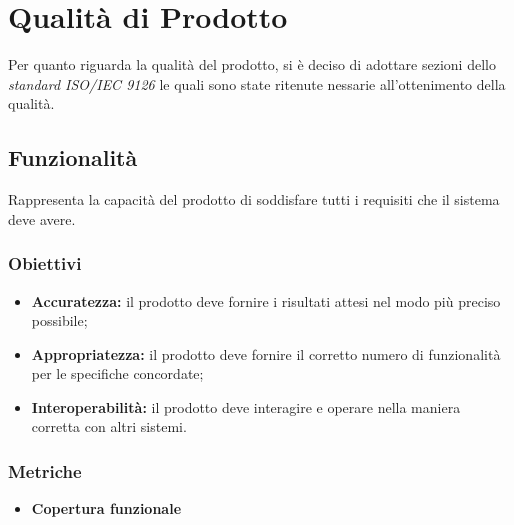\section{Qualità di Prodotto}
Per quanto riguarda la qualità del prodotto, si è deciso di adottare sezioni dello
\textit{standard ISO/IEC 9126\glos} le quali sono state ritenute nessarie
all'ottenimento della qualità.
\subsection{Funzionalità}
Rappresenta la capacità del prodotto di soddisfare tutti i requisiti che il sistema deve avere.
\subsubsection{Obiettivi}
\begin{itemize}
	\item \textbf{Accuratezza:} il prodotto deve fornire i risultati attesi nel modo più preciso possibile;
	\item \textbf{Appropriatezza:} il prodotto deve fornire il corretto numero di funzionalità per le specifiche concordate;
	\item \textbf{Interoperabilità:} il prodotto deve interagire e operare nella maniera corretta con altri sistemi.
\end{itemize}
\subsubsection{Metriche}
\begin{itemize}
	\item \textbf{Copertura funzionale}
\end{itemize}

